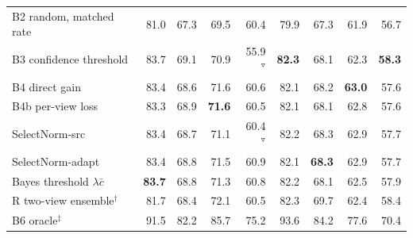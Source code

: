 \begin{tabular}{@{}lrrrrrrrr@{}}
B2 random, matched rate & 81.0 & 67.3 & 69.5 & 60.4 & 79.9 & 67.3 & 61.9 & 56.7\\
B3 confidence threshold & 83.7 & 69.1 & 70.9 & 55.9$^{\triangledown}$ & \textbf{82.3} & 68.1 & 62.3 & \textbf{58.3}\\
B4 direct gain & 83.4 & 68.6 & 71.6 & 60.6 & 82.1 & 68.2 & \textbf{63.0} & 57.6\\
B4b per-view loss & 83.3 & 68.9 & \textbf{71.6} & 60.5 & 82.1 & 68.1 & 62.8 & 57.6\\
SelectNorm-src & 83.4 & 68.7 & 71.1 & 60.4$^{\triangledown}$ & 82.2 & 68.3 & 62.9 & 57.7\\
\rowcolor{black!6}SelectNorm-adapt & 83.4 & 68.8 & 71.5 & 60.9 & 82.1 & \textbf{68.3} & 62.9 & 57.7\\
\quad Bayes threshold $\lambda\bar c$ & \textbf{83.7} & 68.8 & 71.3 & 60.8 & 82.2 & 68.1 & 62.5 & 57.9\\
\addlinespace[2pt]
R two-view ensemble$^\dagger$ & 81.7 & 68.4 & 72.1 & 60.5 & 82.3 & 69.7 & 62.4 & 58.4\\
B6 oracle$^\ddagger$ & 91.5 & 82.2 & 85.7 & 75.2 & 93.6 & 84.2 & 77.6 & 70.4\\
\bottomrule\end{tabular}
